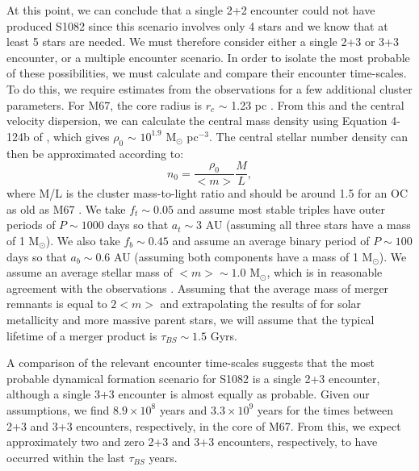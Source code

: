 \begin{enumerate}
At this point, we can conclude that a single 2+2 encounter could not
have produced S1082 since this scenario involves only 4 stars and we
know that at least 5 stars are needed.  We must therefore consider
either a single 2+3 or 3+3 encounter, or a multiple encounter
scenario.  In order to isolate the most probable of these
possibilities, we must calculate and compare their encounter
time-scales.  To do this, we require
estimates from the observations for a few additional 
cluster parameters.  For M67, the core radius is $r_c$ $\sim$ 1.23
pc \citep{bonatto05, giersz08}.  From this and the central velocity
dispersion, we can calculate the central mass density using Equation
4-124b of
\citet{binney87}, which gives $\rho_0$ $\sim$ $10^{1.9}$ M$_{\odot}$
pc$^{-3}$.  The central stellar number density can then be
approximated according to:
\begin{equation}
\label{eqn:num-density}
n_0 = \frac{\rho_0}{<m>}\frac{M}{L},
\end{equation}
where M/L is the cluster mass-to-light ratio and should be
around 1.5 for an OC as old as M67 \citep[e.g.][]{degrijs08}.  We take
$f_t \sim 0.05$ and assume most stable triples have 
outer periods of $P \sim 1000$ days so that $a_t \sim 3$ AU (assuming
all three stars have a mass of 1 M$_{\odot}$).  We also take $f_b \sim
0.45$ and assume an average binary period of $P \sim 100$ days so that
$a_b \sim 0.6$ AU (assuming both components have a mass of 1
M$_{\odot}$).  We assume an average stellar mass of $<m> \sim 
1.0$ M$_{\odot}$, which is in reasonable agreement with
the observations \citep{girard89}.  Assuming
that the average mass of merger remnants is equal to $2<m>$
and extrapolating the results of
\citet{sills01} for solar metallicity and more massive parent stars,
we will assume that the typical lifetime of a merger product is
$\tau_{BS} \sim 1.5$ Gyrs.

A comparison of the relevant encounter time-scales suggests that the
most probable dynamical formation scenario for S1082 is a single 2+3 
encounter, although a single 3+3 encounter is almost equally as
probable.  Given our assumptions, we find %
$8.9 \times 10^8$ years and $3.3 \times 10^9$ years for the times between
2+3 and 3+3 encounters, respectively, in the core of M67.  From this,
we expect approximately 
two and zero 
2+3 and 3+3 encounters, respectively, to have occurred within the last
$\tau_{BS}$ years.  


\end{enumerate}
